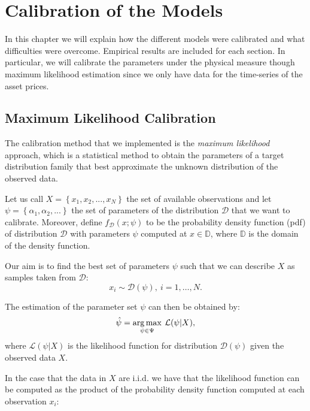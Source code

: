 \chapter{Calibration of the Models}
\label{chpr:calibration}

In this chapter we will explain how the different models were calibrated and what difficulties were overcome. Empirical results are included for each section.
In particular, we will calibrate the parameters under the physical measure though maximum likelihood estimation since we only have data for the time-series of the asset prices. 

\bigskip

\section{Maximum Likelihood Calibration}
\label{sec:calib_overview}
The calibration method that we implemented is the \textit{maximum likelihood} approach, which is a statistical method to obtain the parameters of a target distribution family that best approximate the unknown distribution of the observed data.

Let us call $X = \left\lbrace x_1, x_2, ... , x_N \right\rbrace$ the set of available observations and let $\psi= \left\lbrace \alpha_1, \alpha_2, ... \right\rbrace $ the set of parameters of the distribution $ \mathcal{D}$ that we want to calibrate.
Moreover, define $f_\mathcal{D} (x ; \psi)$ to be the probability density function (pdf) of distribution $\mathcal{D}$ with parameters $\psi$ computed at $x \in \mathbb{D}$, where $\mathbb{D}$ is the domain of the density function.

Our aim is to find the best set of parameters $\psi$ such that we can describe $X$ as samples taken from $\mathcal{D}$:
\begin{equation}
x_i \sim \mathcal{D} (\psi), \: i = 1, \dots, N.
\end{equation}

The estimation of the parameter set $\psi$ can then be obtained by:
\begin{equation}
	\hat{\psi} = \operatorname*{arg\,max}_{\psi \in \Psi} \:\mathcal{L}(\psi |  X),
\end{equation}
\noindent
where $\mathcal{L}(\psi |  X)$ is the likelihood function for distribution $\mathcal{D}(\psi)$ given the observed data $X$.

In the case that the data in $X$ are i.i.d. we have that the likelihood function can be computed as the product of the probability density function computed at each observation $x_i$:

